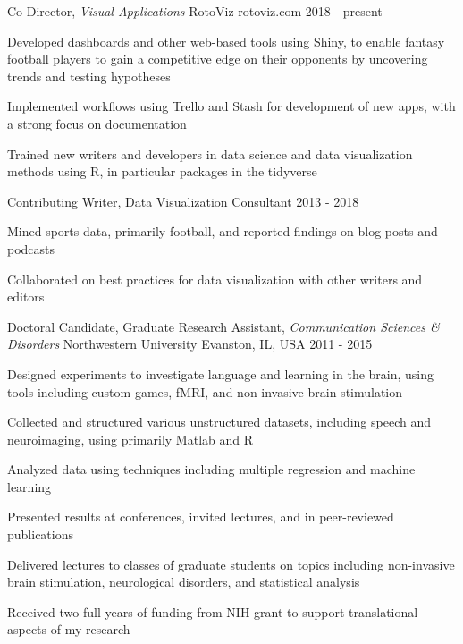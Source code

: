 \begin{cventries}
 \cventry
 {Co-Director, \textit{Visual Applications}}
 {RotoViz}
 {rotoviz.com}
 {2018 - present}
 {
   \begin{cvitems}
   \item {Developed dashboards and other web-based tools using Shiny, to enable fantasy football players to gain a competitive edge on their opponents by uncovering trends and testing hypotheses}
   \item {Implemented workflows using Trello and Stash for development of new apps, with a strong focus on documentation}
   \item {Trained new writers and developers in data science and data visualization methods using R, in particular packages in the tidyverse}
   \end{cvitems}
   }
   
   \cventry
   {Contributing Writer, Data Visualization Consultant}
   {}
   {}
   {2013 - 2018}
   {
    \begin{cvitems}
    \item {Mined sports data, primarily football, and reported findings on blog posts and podcasts}
    \item {Collaborated on best practices for data visualization with other writers and editors}
    \end{cvitems}
    }
  \cventry
    {Doctoral Candidate, Graduate Research Assistant, \textit{Communication Sciences \& Disorders}} %
    {Northwestern University} %
    {Evanston, IL, USA} %
    {2011 - 2015} %
    {
      \begin{cvitems}
      \item {Designed experiments to investigate language and learning in the brain, using tools including custom games, fMRI, and non-invasive brain stimulation}
      \item {Collected and structured various unstructured datasets, including speech and neuroimaging, using primarily Matlab and R}
      \item {Analyzed data using techniques including multiple regression and machine learning}
      \item {Presented results at conferences, invited lectures, and in peer-reviewed publications}
      \item {Delivered lectures to classes of graduate students on topics including non-invasive brain stimulation, neurological disorders, and statistical analysis}
      \item {Received two full years of funding from NIH grant to support translational aspects of my research}
      \end{cvitems}
    }
    

\end{cventries}
